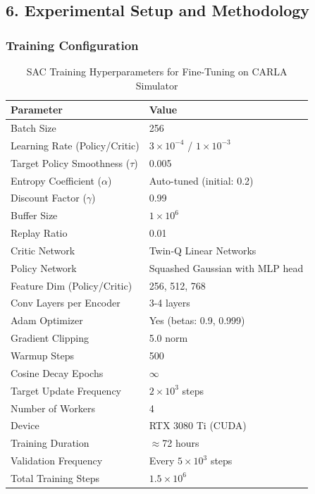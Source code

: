 \documentclass[10pt,a4paper,twocolumn]{article}
\begin{document}
\vfill

\subsection*{6. Experimental Setup and Methodology}

\subsubsection*{Training Configuration}

\begin{table}[h]
    \centering
    \caption{SAC Training Hyperparameters for Fine-Tuning on CARLA Simulator}
    \label{tab:hyperparameters}
    \begin{tabular}{ll}
        \toprule
        \textbf{Parameter} & \textbf{Value} \\
        \midrule
        Batch Size & 256 \\
        Learning Rate (Policy/Critic) & $3\times10^{-4}$ / $1\times10^{-3}$ \\
        Target Policy Smoothness ($\tau$) & 0.005 \\
        Entropy Coefficient ($\alpha$) & Auto-tuned (initial: 0.2) \\
        Discount Factor ($\gamma$) & 0.99 \\
        Buffer Size & $1\times10^6$ \\
        Replay Ratio & 0.01 \\
        Critic Network & Twin-Q Linear Networks \\
        Policy Network & Squashed Gaussian with MLP head \\
        Feature Dim (Policy/Critic) & 256, 512, 768 \\
        Conv Layers per Encoder & 3-4 layers \\
        Adam Optimizer & Yes (betas: 0.9, 0.999) \\
        Gradient Clipping & 5.0 norm \\
        Warmup Steps & 500 \\
        Cosine Decay Epochs & $\infty$ \\
        Target Update Frequency & $2 \times 10^3$ steps \\
        Number of Workers & 4 \\
        Device & RTX 3080 Ti (CUDA) \\
        \midrule
        Training Duration & $\approx$72 hours \\
        Validation Frequency & Every $5 \times 10^3$ steps \\
        Total Training Steps & $1.5 \times 10^6$ \\
        \bottomrule
    \end{tabular}
\end{table}
\end{document}
